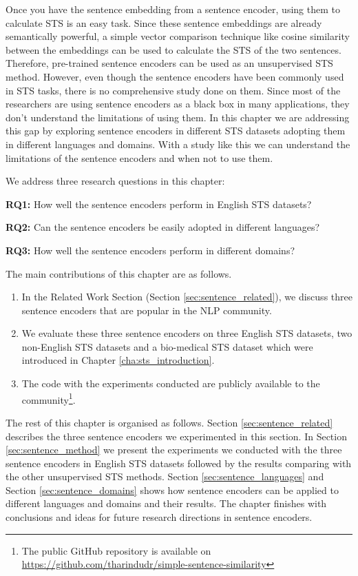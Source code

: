 Once you have the sentence embedding from a sentence encoder, using them to calculate STS is an easy task. Since these sentence embeddings are already semantically powerful, a simple vector comparison technique like cosine similarity between the embeddings can be used to calculate the STS of the two sentences. Therefore, pre-trained sentence encoders can be used as an unsupervised STS method. However, even though the sentence encoders have been commonly used in STS tasks, there is no comprehensive study done on them. Since most of the researchers are using sentence encoders as a black box in many applications, they don't understand the limitations of using them. In this chapter we are addressing this gap by exploring sentence encoders in different STS datasets adopting them in different languages and domains. With a study like this we can understand the limitations of the sentence encoders and when not to use them. 

We address three research questions in this chapter:

\textbf{RQ1:} How well the sentence encoders perform in English STS datasets?

\textbf{RQ2:} Can the sentence encoders be easily adopted in different languages?

\textbf{RQ3:} How well the sentence encoders perform in different domains?

The main contributions of this chapter are as follows.

\begin{enumerate}
	\item In the Related Work Section (Section \ref{sec:sentence_related}), we discuss three sentence encoders that are popular in the NLP community. 
	
	\item  We evaluate these three sentence encoders on three English STS datasets, two non-English STS datasets and a bio-medical STS dataset which were introduced in Chapter \ref{cha:sts_introduction}.
	
	\item The code with the experiments conducted are publicly available to the community\footnote{The public GitHub repository is available on \url{https://github.com/tharindudr/simple-sentence-similarity}}.
	
\end{enumerate}

The rest of this chapter is organised as follows. Section \ref{sec:sentence_related} describes the three sentence encoders we experimented in this section. In Section \ref{sec:sentence_method} we present the experiments we conducted with the three sentence encoders in English STS datasets followed by the results comparing with the other unsupervised STS methods. Section \ref{sec:sentence_languages} and Section \ref{sec:sentence_domains} shows how sentence encoders can be applied to different languages and domains and their results. The chapter finishes with conclusions and ideas for future research directions in sentence encoders.


